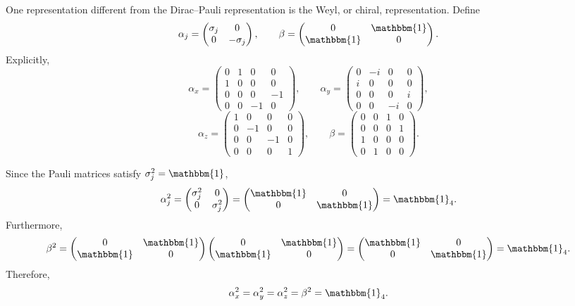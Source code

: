 \documentclass[12pt,a4paper]{article}
\begin{document}
\begin{solution_pset}
		One representation different from the Dirac--Pauli representation is the Weyl, or chiral, representation\cite{Weyl1929}. Define
		\[
			\alpha_j=
			\begin{pmatrix}
				\sigma_j&0\\
				0&-\sigma_j
			\end{pmatrix},
			\qquad
			\beta=
			\begin{pmatrix}
				0&\mathbbm{1}\\
				\mathbbm{1}&0
			\end{pmatrix}.
		\]
		Explicitly,
		\[
			\alpha_x=
			\begin{pmatrix}
				0&1&0&0\\
				1&0&0&0\\
				0&0&0&-1\\
				0&0&-1&0
			\end{pmatrix},
			\qquad
			\alpha_y=
			\begin{pmatrix}
				0&-i&0&0\\
				i&0&0&0\\
				0&0&0&i\\
				0&0&-i&0
			\end{pmatrix},
		\]
		\[
			\alpha_z=
			\begin{pmatrix}
				1&0&0&0\\
				0&-1&0&0\\
				0&0&-1&0\\
				0&0&0&1
			\end{pmatrix},
			\qquad
			\beta=
			\begin{pmatrix}
				0&0&1&0\\
				0&0&0&1\\
				1&0&0&0\\
				0&1&0&0
			\end{pmatrix}.
		\]

		Since the Pauli matrices satisfy $\sigma_j^2=\mathbbm{1}$,
		\[
			\alpha_j^2
			=
			\begin{pmatrix}
				\sigma_j^2&0\\
				0&\sigma_j^2
			\end{pmatrix}
			=
			\begin{pmatrix}
				\mathbbm{1}&0\\
				0&\mathbbm{1}
			\end{pmatrix}
			=\mathbbm{1}_4.
		\]
		Furthermore,
		\[
			\beta^2
			=
			\begin{pmatrix}
				0&\mathbbm{1}\\
				\mathbbm{1}&0
			\end{pmatrix}
			\begin{pmatrix}
				0&\mathbbm{1}\\
				\mathbbm{1}&0
			\end{pmatrix}
			=
			\begin{pmatrix}
				\mathbbm{1}&0\\
				0&\mathbbm{1}
			\end{pmatrix}
			=\mathbbm{1}_4.
		\]
		Therefore,
		\[
			\alpha_x^2=\alpha_y^2=\alpha_z^2=\beta^2=\mathbbm{1}_4.
		\]


\end{solution_pset}
\end{document}
